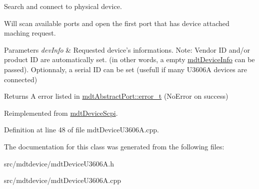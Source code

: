 Search and connect to physical device. 

Will scan available ports and open the first port that has device attached maching request.


\begin{DoxyParams}{Parameters}
{\em devInfo} & Requested device's informations. Note: Vendor ID and/or product ID are automatically set. (in other words, a empty \hyperlink{classmdt_device_info}{mdtDeviceInfo} can be passed). Optionnaly, a serial ID can be set (usefull if many U3606A devices are connected) \\
\hline
\end{DoxyParams}
\begin{DoxyReturn}{Returns}
A error listed in \hyperlink{classmdt_abstract_port_ad4121bb930c95887e77f8bafa065a85e}{mdtAbstractPort::error\_\-t} (NoError on success) 
\end{DoxyReturn}


Reimplemented from \hyperlink{classmdt_device_scpi_ae8e886b362cbf9d1bf7064b48348b8e8}{mdtDeviceScpi}.



Definition at line 48 of file mdtDeviceU3606A.cpp.



The documentation for this class was generated from the following files:\begin{DoxyCompactItemize}
\item 
src/mdtdevice/mdtDeviceU3606A.h\item 
src/mdtdevice/mdtDeviceU3606A.cpp\end{DoxyCompactItemize}
